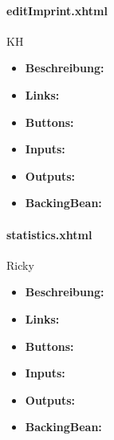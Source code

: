 				\paragraph{editImprint.xhtml}
					KH\\
					\begin{itemize}
						\item \textbf{Beschreibung:}
						\item \textbf{Links:}
						\item \textbf{Buttons:}
						\item \textbf{Inputs:}
						\item \textbf{Outputs:}
						\item \textbf{BackingBean:}
					\end{itemize}
				
				\paragraph{statistics.xhtml}
				Ricky
					\begin{itemize}
						\item \textbf{Beschreibung:}
						\item \textbf{Links:}
						\item \textbf{Buttons:}
						\item \textbf{Inputs:}
						\item \textbf{Outputs:}
						\item \textbf{BackingBean:}
					\end{itemize}